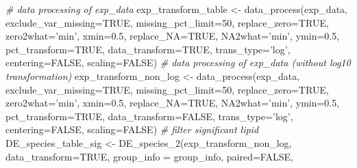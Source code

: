 \documentclass[]{article}
\newcommand{\hlnum}[1]{\textcolor[rgb]{0.816,0.125,0.439}{#1}}%
\newcommand{\hlstr}[1]{\textcolor[rgb]{0.251,0.627,0.251}{#1}}%
\newcommand{\hlcom}[1]{\textcolor[rgb]{0.502,0.502,0.502}{\textit{#1}}}%
\newcommand{\hlstd}[1]{\textcolor[rgb]{0.251,0.251,0.251}{#1}}%
\newcommand{\hlkwc}[1]{\textcolor[rgb]{0.251,0.251,0.251}{#1}}%
\newcommand{\hlkwd}[1]{\textcolor[rgb]{0.878,0.439,0.125}{#1}}%
\newenvironment{Shaded}{\begin{myshaded}}{\end{myshaded}}
\newcommand{\KeywordTok}[1]{\hlkwd{#1}}
\newcommand{\DataTypeTok}[1]{\hlkwc{#1}}
\newcommand{\DecValTok}[1]{\hlnum{#1}}
\newcommand{\FloatTok}[1]{\hlnum{#1}}
\newcommand{\StringTok}[1]{\hlstr{#1}}
\newcommand{\CommentTok}[1]{\hlcom{#1}}
\newcommand{\OtherTok}[1]{{#1}}
\newcommand{\NormalTok}[1]{\hlstd{#1}}
\begin{document}
\begin{Shaded}
\begin{Highlighting}[]
\CommentTok{# data processing of exp_data}
\NormalTok{exp_transform_table <-}\StringTok{ }\KeywordTok{data_process}\NormalTok{(exp_data, }\DataTypeTok{exclude_var_missing=}\OtherTok{TRUE}\NormalTok{,}
                                    \DataTypeTok{missing_pct_limit=}\DecValTok{50}\NormalTok{, }
                                    \DataTypeTok{replace_zero=}\OtherTok{TRUE}\NormalTok{, }\DataTypeTok{zero2what=}\StringTok{'min'}\NormalTok{, }
                                    \DataTypeTok{xmin=}\FloatTok{0.5}\NormalTok{, }\DataTypeTok{replace_NA=}\OtherTok{TRUE}\NormalTok{,}
                                    \DataTypeTok{NA2what=}\StringTok{'min'}\NormalTok{, }\DataTypeTok{ymin=}\FloatTok{0.5}\NormalTok{, }
                                    \DataTypeTok{pct_transform=}\OtherTok{TRUE}\NormalTok{,}
                                    \DataTypeTok{data_transform=}\OtherTok{TRUE}\NormalTok{, }\DataTypeTok{trans_type=}\StringTok{'log'}\NormalTok{,}
                                    \DataTypeTok{centering=}\OtherTok{FALSE}\NormalTok{, }\DataTypeTok{scaling=}\OtherTok{FALSE}\NormalTok{)}
\CommentTok{# data processing of exp_data (without log10 transformation)}
\NormalTok{exp_transform_non_log <-}\StringTok{ }\KeywordTok{data_process}\NormalTok{(exp_data, }\DataTypeTok{exclude_var_missing=}\OtherTok{TRUE}\NormalTok{,}
                                      \DataTypeTok{missing_pct_limit=}\DecValTok{50}\NormalTok{, }\DataTypeTok{replace_zero=}\OtherTok{TRUE}\NormalTok{,}
                                      \DataTypeTok{zero2what=}\StringTok{'min'}\NormalTok{, }\DataTypeTok{xmin=}\FloatTok{0.5}\NormalTok{,}
                                      \DataTypeTok{replace_NA=}\OtherTok{TRUE}\NormalTok{, }\DataTypeTok{NA2what=}\StringTok{'min'}\NormalTok{,}
                                      \DataTypeTok{ymin=}\FloatTok{0.5}\NormalTok{, }\DataTypeTok{pct_transform=}\OtherTok{TRUE}\NormalTok{,}
                                      \DataTypeTok{data_transform=}\OtherTok{FALSE}\NormalTok{, }\DataTypeTok{trans_type=}\StringTok{'log'}\NormalTok{,}
                                      \DataTypeTok{centering=}\OtherTok{FALSE}\NormalTok{, }\DataTypeTok{scaling=}\OtherTok{FALSE}\NormalTok{)}
\CommentTok{# filter significant lipid}
\NormalTok{DE_species_table_sig <-}\StringTok{ }\KeywordTok{DE_species_2}\NormalTok{(exp_transform_non_log, }
                                     \DataTypeTok{data_transform=}\OtherTok{TRUE}\NormalTok{,}
                                     \DataTypeTok{group_info =}\NormalTok{ group_info, }\DataTypeTok{paired=}\OtherTok{FALSE}\NormalTok{,}

\end{Highlighting}
\end{Shaded}
\end{document}
